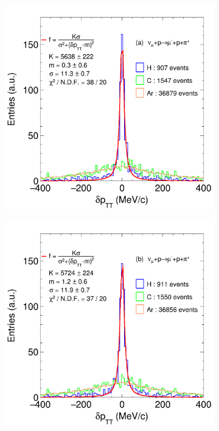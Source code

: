 \begin{figure}[t]
     \centering
     \begin{subfigure}[b]{0.48\textwidth}
         \centering
         \includegraphics[width=\textwidth]{figures/ch6-TKI/1D/ALICEStMC_dpTT_numuCC_Fit.png}
         \caption{}
         \label{fig:dpTT_ALICEStMCReco}
     \end{subfigure}
    \begin{subfigure}[b]{0.48\textwidth}
         \centering
         \includegraphics[width=\textwidth]{figures/ch6-TKI/1D/ALICEStRecoGAr_dpTT_numuCC_Fit.png}

\end{subfigure}
\end{figure}
